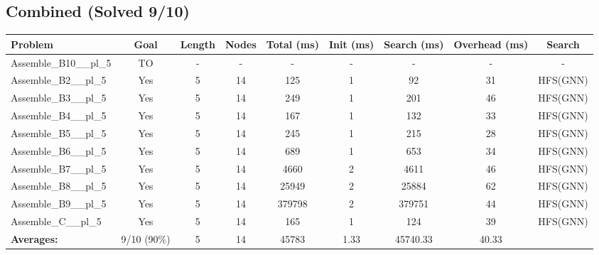 \documentclass{article}
\begin{document}
\subsection*{Combined (Solved 9/10)}
\begin{tabular}{lcccccccc}
\toprule
Problem & Goal & Length & Nodes & Total (ms) & Init (ms) & Search (ms) & Overhead (ms) & Search \\
\midrule
Assemble\_B10\_\_pl\_5 & TO & - & - & - & - & - & - & - \\
Assemble\_B2\_\_pl\_5 & Yes & 5 & 14 & 125 & 1 & 92 & 31 & HFS(GNN) \\
Assemble\_B3\_\_pl\_5 & Yes & 5 & 14 & 249 & 1 & 201 & 46 & HFS(GNN) \\
Assemble\_B4\_\_pl\_5 & Yes & 5 & 14 & 167 & 1 & 132 & 33 & HFS(GNN) \\
Assemble\_B5\_\_pl\_5 & Yes & 5 & 14 & 245 & 1 & 215 & 28 & HFS(GNN) \\
Assemble\_B6\_\_pl\_5 & Yes & 5 & 14 & 689 & 1 & 653 & 34 & HFS(GNN) \\
Assemble\_B7\_\_pl\_5 & Yes & 5 & 14 & 4660 & 2 & 4611 & 46 & HFS(GNN) \\
Assemble\_B8\_\_pl\_5 & Yes & 5 & 14 & 25949 & 2 & 25884 & 62 & HFS(GNN) \\
Assemble\_B9\_\_pl\_5 & Yes & 5 & 14 & 379798 & 2 & 379751 & 44 & HFS(GNN) \\
Assemble\_C\_\_pl\_5 & Yes & 5 & 14 & 165 & 1 & 124 & 39 & HFS(GNN) \\
\textbf{Averages:} & 9/10 (90\%) & 5 & 14 & 45783 & 1.33 & 45740.33 & 40.33 & \\
\bottomrule
\end{tabular}
\\[0.7cm]
\end{document}
